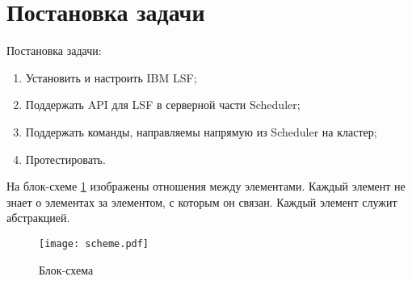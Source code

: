 \section{Постановка задачи}

Постановка задачи:
\begin{enumerate}
    \item Установить и настроить IBM LSF;
    \item Поддержать API для LSF в серверной части Scheduler;
    \item Поддержать команды, направляемы напрямую из Scheduler на кластер;
    \item Протестировать.
\end{enumerate}

На блок-схеме \ref{fig:block-scheme} изображены отношения между элементами. Каждый элемент не знает о элементах за элементом, с которым он связан. Каждый элемент служит абстракцией.

\begin{figure}[h]
    \centering
    \texttt{[image: scheme.pdf]}
    \caption{Блок-схема}
    \label{fig:block-scheme}
\end{figure}

\clearpage
